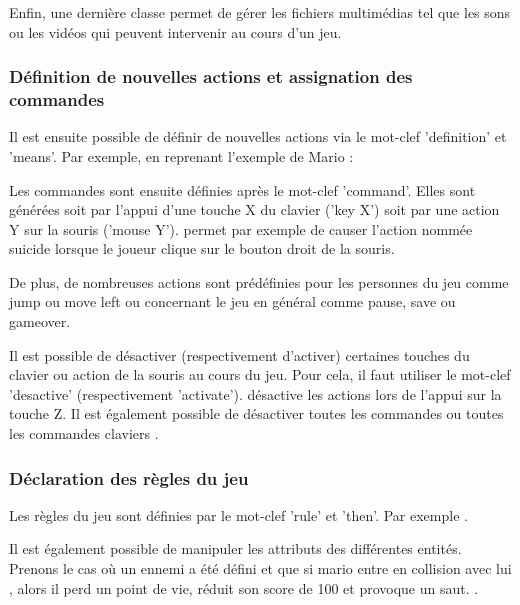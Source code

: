 Enfin, une dernière classe permet de gérer les fichiers multimédias tel que les sons ou les vidéos qui peuvent intervenir au cours d'un jeu.

\subsubsection{Définition de nouvelles actions et assignation des commandes}

Il est ensuite possible de définir de nouvelles actions via le mot-clef 'definition' et 'means'.
Par exemple, en reprenant l'exemple de Mario : 

Les commandes sont ensuite définies après le mot-clef 'command'. Elles sont générées soit par l'appui d'une touche X du clavier ('key X') soit par 
une action Y sur la souris ('mouse Y').
 permet par exemple de causer l'action nommée suicide lorsque le joueur clique sur le bouton droit de la souris.

De plus, de nombreuses actions sont prédéfinies pour les personnes du jeu comme jump ou move left ou concernant le jeu en général comme pause, save ou gameover.
 

Il est possible de désactiver (respectivement d'activer) certaines touches du clavier ou action de la souris au cours du jeu.
Pour cela, il faut utiliser le mot-clef 'desactive' (respectivement 'activate').
 désactive les actions lors de l'appui sur la touche Z.
Il est également possible de désactiver toutes les commandes  ou toutes les commandes claviers .

\subsubsection{Déclaration des règles du jeu}

Les règles du jeu sont définies par le mot-clef 'rule' et 'then'.
Par exemple .

Il est également possible de manipuler les attributs des différentes entités. Prenons le cas où un ennemi a été défini 
et que si mario entre en collision avec lui , alors il perd un point de vie, réduit son score de 100 et provoque un saut.
 .

